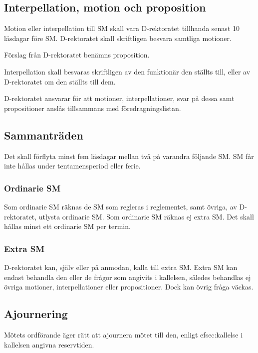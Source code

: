 \documentclass[a4paper,12pt]{article}
\begin{document}
\subsection{Interpellation, motion och proposition}

Motion eller interpellation till SM skall vara D-rektoratet tillhanda senast 10 läsdagar före SM. D-rektoratet skall skriftligen besvara samtliga motioner.

Förslag från D-rektoratet benämns proposition.

Interpellation skall besvaras skriftligen av den funktionär den ställts till, eller av D-rektoratet om den ställts till dem.

D-rektoratet ansvarar för att motioner, interpellationer, svar på dessa samt propositioner anslås tillsammans med föredragningslistan.

\subsection{Sammanträden}

Det skall förflyta minst fem läsdagar mellan två på varandra följande SM. SM får inte hållas under tentamensperiod eller ferie.

\subsubsection{Ordinarie SM}
\label{sec:ordinarie_sm}

Som ordinarie SM räknas de SM som regleras i reglementet, samt övriga, av D-rektoratet, utlysta ordinarie SM. Som ordinarie SM räknas ej extra SM. Det skall hållas minst ett ordinarie SM per termin.

\subsubsection{Extra SM}

D-rektoratet kan, själv eller på anmodan, kalla till extra SM. Extra SM kan endast behandla den eller de frågor som angivits i kallelsen, således behandlas ej övriga motioner, interpellationer eller propositioner. Dock kan övrig fråga väckas.

\subsection{Ajournering}
\label{sec:ajournering}

Mötets ordförande äger rätt att ajournera mötet till den, enligt 
ef{sec:kallelse} i kallelsen angivna reservtiden.
\end{document}
